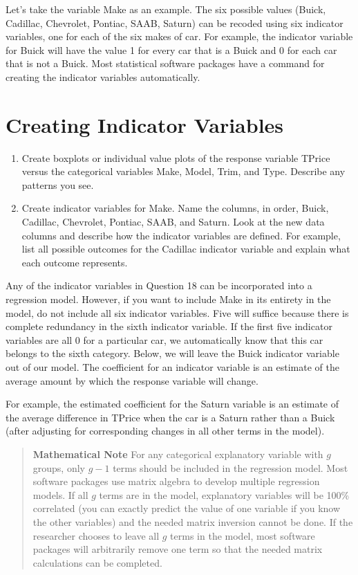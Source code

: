 \documentclass[
]{report}
\begin{document}
Let's take the variable Make as an example. The six possible values (Buick, Cadillac, Chevrolet, Pontiac, SAAB, Saturn) can be recoded using six indicator variables, one for each of the six makes of car. For example, the indicator variable for Buick will have the value 1 for every car that is a Buick and 0 for each car that is not a Buick. Most statistical software packages have a command for creating the indicator variables automatically.

\section*{Creating Indicator Variables}\label{creating-indicator-variables}

\begin{enumerate}
\def\labelenumi{\arabic{enumi}.}
\setcounter{enumi}{16}
\item
  Create boxplots or individual value plots of the response variable TPrice versus the categorical variables Make, Model, Trim, and Type. Describe any patterns you see.
\item
  Create indicator variables for Make. Name the columns, in order, Buick, Cadillac, Chevrolet, Pontiac, SAAB, and Saturn. Look at the new data columns and describe how the indicator variables are defined. For example, list all possible outcomes for the Cadillac indicator variable and explain what each outcome
  represents.
\end{enumerate}

Any of the indicator variables in Question 18 can be incorporated into a regression model. However, if you want to include Make in its entirety in the model, do not include all six indicator variables. Five will suffice because there is complete redundancy in the sixth indicator variable. If the first five indicator variables are all 0 for a particular car, we automatically know that this car belongs to
the sixth category. Below, we will leave the Buick indicator variable out of our model. The coefficient for an indicator variable is an estimate of the average amount by which the response variable will change.

For example, the estimated coefficient for the Saturn variable is an estimate of the average difference in TPrice when the car is a Saturn rather than a Buick (after adjusting for corresponding changes in all other terms in the model).

\begin{quote}
\textbf{Mathematical Note}
For any categorical explanatory variable with \(g\) groups, only \(g - 1\) terms should be included in the regression model. Most software packages use matrix algebra to develop multiple regression models. If all \(g\) terms are in the model, explanatory variables will be 100\% correlated (you can exactly predict the value of one variable if you know the other variables) and the needed matrix inversion cannot be done. If
the researcher chooses to leave all \(g\) terms in the model, most software packages will arbitrarily remove one term so that the needed matrix calculations can be completed.
\end{quote}
\end{document}
